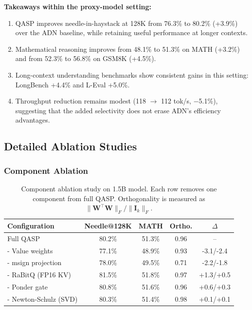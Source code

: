 \documentclass[twocolumn]{article}
\begin{document}
\textbf{Takeaways within the proxy-model setting:}
\begin{enumerate}
    \item QASP improves needle-in-haystack at 128K from 76.3\% to 80.2\% (+3.9\%) over the ADN baseline, while retaining useful performance at longer contexts.
    \item Mathematical reasoning improves from 48.1\% to 51.3\% on MATH (+3.2\%) and from 52.3\% to 56.8\% on GSM8K (+4.5\%).
    \item Long-context understanding benchmarks show consistent gains in this setting: LongBench +4.4\% and L-Eval +5.0\%.
    \item Throughput reduction remains modest (118 $\rightarrow$ 112 tok/s, $-$5.1\%), suggesting that the added selectivity does not erase ADN's efficiency advantages.
\end{enumerate}

\subsection{Detailed Ablation Studies}

\subsubsection{Component Ablation}

\begin{table}[htbp]
\centering
\caption{Component ablation study on 1.5B model. Each row removes one component from full QASP. Orthogonality is measured as $\|\mathbf{W}^\top\mathbf{W}\|_F / \|\mathbf{I}_k\|_F$.}
\label{tab:component-ablation}
\begin{tabular}{lcccc}
\toprule
\textbf{Configuration} & \textbf{Needle@128K} & \textbf{MATH} & \textbf{Ortho.} & $\Delta$ \\
\midrule
Full QASP & 80.2\% & 51.3\% & 0.96 & -- \\
\quad - Value weights & 77.1\% & 48.9\% & 0.93 & -3.1/-2.4 \\
\quad - msign projection & 78.0\% & 49.5\% & 0.71 & -2.2/-1.8 \\
\quad - RaBitQ (FP16 KV) & 81.5\% & 51.8\% & 0.97 & +1.3/+0.5 \\
\quad - Ponder gate & 80.8\% & 51.6\% & 0.96 & +0.6/+0.3 \\
\quad - Newton-Schulz (SVD) & 80.3\% & 51.4\% & 0.98 & +0.1/+0.1 \\
\bottomrule
\end{tabular}
\end{table}
\end{document}

